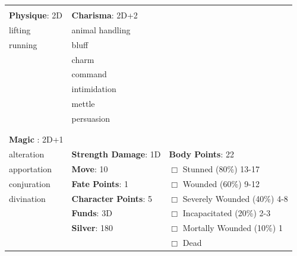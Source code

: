 \documentclass[10pt]{article}
\begin{document}
\begin{table}
\begin{tabular}{m{156pt} m{156pt} m{156pt}}
 \hrulefill &  \hrulefill &  \hrulefill \\


\textbf{Physique}: 2D \hrulefill & \textbf{Charisma}: 2D+2 \hrulefill     &  \hrulefill \\

lifting              \hrulefill & animal handling      \hrulefill &  \hrulefill \\

running              \hrulefill & bluff                \hrulefill &  \hrulefill \\

 \hrulefill & charm                \hrulefill &  \hrulefill \\

 \hrulefill & command              \hrulefill &  \hrulefill \\

 \hrulefill & intimidation         \hrulefill &  \hrulefill \\

 \hrulefill & mettle               \hrulefill &  \hrulefill \\

 \hrulefill & persuasion           \hrulefill &  \hrulefill \\

 \hrulefill &  \hrulefill &  \hrulefill \\

                                  &                                 &                             \\
\textbf{Magic }: 2D+1 \hrulefill  &                                 &                             \\
alteration           \hrulefill & \textbf{Strength Damage}: 1D \hrulefill                             & \textbf{Body Points}: 22 \hrulefill \\
apportation          \hrulefill                        & \textbf{Move}:             10             \hrulefill    & $\Box$ Stunned \footnotesize{(80\%)} \hfill 13-17 \\
conjuration          \hrulefill                        & \textbf{Fate Points}:      1      \hrulefill    & $\Box$ Wounded \footnotesize{(60\%)} \hfill 9-12 \\
divination           \hrulefill                        & \textbf{Character Points}: 5 \hrulefill    & $\Box$ Severely Wounded \footnotesize{(40\%)} \hfill 4-8 \\
 \hrulefill                        & \textbf{Funds}:            3D            \hrulefill    & $\Box$ Incapacitated \footnotesize{(20\%)} \hfill 2-3 \\
 \hrulefill                        & \textbf{Silver}:           180           \hrulefill    & $\Box$ Mortally Wounded \footnotesize{(10\%)} \hfill 1 \\
 \hrulefill                        &  \hrulefill                                                       & $\Box$ Dead   \\
\end{tabular}
\end{table}
\end{document}
